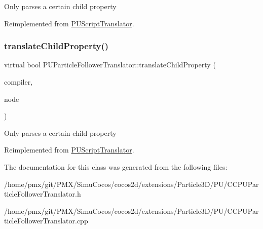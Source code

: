 Only parses a certain child property 

Reimplemented from \hyperlink{classPUScriptTranslator_a0374d83a8a04e57918975d525e0f8fe8}{P\+U\+Script\+Translator}.

\mbox{\label{classPUParticleFollowerTranslator_a1fe452f94c21682af876747b805dfd47}} 
\subsubsection{\texorpdfstring{translate\+Child\+Property()}{translateChildProperty()}\hspace{0.1cm}{\footnotesize\ttfamily [2/2]}}
{\footnotesize\ttfamily virtual bool P\+U\+Particle\+Follower\+Translator\+::translate\+Child\+Property (\begin{DoxyParamCaption}\item[{\hyperlink{classPUScriptCompiler}{P\+U\+Script\+Compiler} $\ast$}]{compiler,  }\item[{\hyperlink{classPUAbstractNode}{P\+U\+Abstract\+Node} $\ast$}]{node }\end{DoxyParamCaption})\hspace{0.3cm}{\ttfamily [virtual]}}

Only parses a certain child property 

Reimplemented from \hyperlink{classPUScriptTranslator_a0374d83a8a04e57918975d525e0f8fe8}{P\+U\+Script\+Translator}.



The documentation for this class was generated from the following files\+:\begin{DoxyCompactItemize}
\item 
/home/pmx/git/\+P\+M\+X/\+Simu\+Cocos/cocos2d/extensions/\+Particle3\+D/\+P\+U/C\+C\+P\+U\+Particle\+Follower\+Translator.\+h\item 
/home/pmx/git/\+P\+M\+X/\+Simu\+Cocos/cocos2d/extensions/\+Particle3\+D/\+P\+U/C\+C\+P\+U\+Particle\+Follower\+Translator.\+cpp\end{DoxyCompactItemize}
